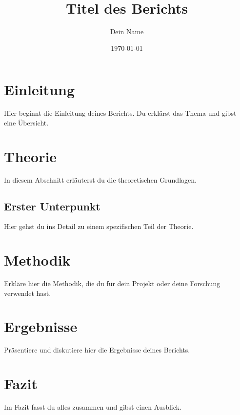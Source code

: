 \documentclass[a4paper, 12pt]{article}
\title{Titel des Berichts}
\author{Dein Name}
\date{\today}               %
\begin{document}
\maketitle                  %

\tableofcontents            %
\newpage                    %

\section{Einleitung}
Hier beginnt die Einleitung deines Berichts. Du erklärst das Thema und gibst eine Übersicht.
\cite{digilink177512-pschyrembel}

\section{Theorie}
In diesem Abschnitt erläuterst du die theoretischen Grundlagen.

\subsection{Erster Unterpunkt}
Hier gehst du ins Detail zu einem spezifischen Teil der Theorie.

\section{Methodik}
Erkläre hier die Methodik, die du für dein Projekt oder deine Forschung verwendet hast.

\section{Ergebnisse}
Präsentiere und diskutiere hier die Ergebnisse deines Berichts.

\section{Fazit}
Im Fazit fasst du alles zusammen und gibst einen Ausblick.

\newpage
{}

\end{document}
